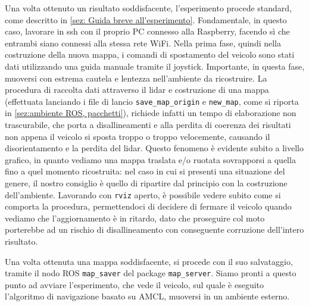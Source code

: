 \vspace{0.5cm}
Una volta ottenuto un risultato soddisfacente, l'esperimento procede standard, come descritto in \ref{sez: Guida breve all'esperimento}. Fondamentale, in questo caso,
lavorare in ssh con il proprio PC connesso alla Raspberry, facendo sì che entrambi siano connessi alla stessa rete WiFi.
Nella prima fase, quindi nella costruzione della nuova mappa, i comandi di spostamento del veicolo sono stati dati utilizzando una guida manuale tramite il joystick.
Importante, in questa fase, muoversi con estrema cautela e lentezza nell'ambiente da ricostruire. La procedura di raccolta dati attraverso il lidar e costruzione di una mappa (effettuata lanciando i file di lancio \verb|save_map_origin| e \verb|new_map|, come si riporta in \ref{sez:ambiente ROS, pacchetti}),
richiede infatti un tempo di elaborazione non trascurabile, che porta a disallineamenti e alla perdita di coerenza dei risultati non appena il veicolo si sposta troppo o troppo
velocemente, causando il disorientamento e la perdita del lidar. Questo fenomeno è evidente subito a livello grafico, in quanto vediamo una mappa traslata e/o ruotata sovrapporsi a quella fino a quel momento ricostruita: nel caso in cui si presenti una situazione del genere, il nostro consiglio è quello di ripartire dal principio con la costruzione dell'ambiente. Lavorando con \verb|rviz| aperto, è possibile vedere subito come si comporta la procedura, permettendoci di decidere di fermare il veicolo quando vediamo che l'aggiornamento è in ritardo, dato che proseguire col moto porterebbe ad un rischio di disallineamento con conseguente corruzione dell'intero risultato.

\vspace{0.5cm}
Una volta ottenuta una mappa soddisfacente, si procede con il suo salvataggio, tramite il nodo ROS \verb|map_saver| del package \verb|map_server|.
Siamo pronti a questo punto ad avviare l'esperimento, che vede il veicolo, sul quale è eseguito l'algoritmo di navigazione basato su AMCL, muoversi in un ambiente esterno.


